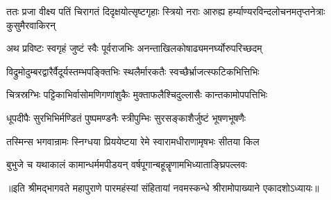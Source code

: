 \twolineshloka
{ततः प्रजा वीक्ष्य पतिं चिरागतं दिदृक्षयोत्सृष्टगृहाः स्त्रियो नराः}
{आरुह्य हर्म्याण्यरविन्दलोचनमतृप्तनेत्राः कुसुमैरवाकिरन्} %

\twolineshloka
{अथ प्रविष्टः स्वगृहं जुष्टं स्वैः पूर्वराजभिः}
{अनन्ताखिलकोषाढ्यमनर्घ्योरुपरिच्छदम्} %

\twolineshloka
{विद्रुमोदुम्बरद्वारैर्वैदूर्यस्तम्भपङ्क्तिभिः}
{स्थलैर्मारकतैः स्वच्छैर्भ्राजत्स्फटिकभित्तिभिः} %

\twolineshloka
{चित्रस्रग्भिः पट्टिकाभिर्वासोमणिगणांशुकैः}
{मुक्ताफलैश्चिदुल्लासैः कान्तकामोपपत्तिभिः} %

\twolineshloka
{धूपदीपैः सुरभिभिर्मण्डितं पुष्पमण्डनैः}
{स्त्रीपुम्भिः सुरसङ्काशैर्जुष्टं भूषणभूषणैः} %

\twolineshloka
{तस्मिन्स भगवान्रामः स्निग्धया प्रिययेष्टया}
{रेमे स्वारामधीराणामृषभः सीतया किल} %

\twolineshloka
{बुभुजे च यथाकालं कामान्धर्ममपीडयन्}
{वर्षपूगान्बहून्नॄणामभिध्याताङ्घ्रिपल्लवः} %


॥इति श्रीमद्भागवते महापुराणे पारमहंस्यां संहितायां नवमस्कन्धे श्रीरामोपाख्याने एकादशोऽध्यायः॥


\closesection